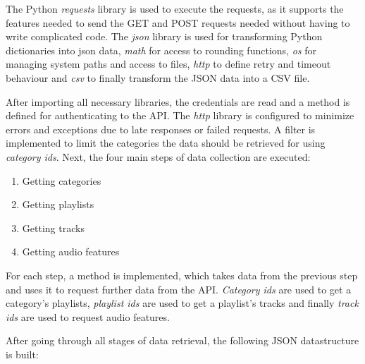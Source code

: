 The Python \emph{requests} library is used to execute the requests, as it supports the features needed to send the GET and POST
requests needed without having to write complicated code.
The \emph{json} library is used for transforming Python dictionaries into json data, \emph{math} for access to rounding functions,
\emph{os} for managing system paths and access to files, \emph{http} to define retry and timeout behaviour and \emph{csv}
to finally transform the JSON data into a CSV file.

After importing all necessary libraries, the credentials are read and a method is defined for authenticating to the API.
The \emph{http} library is configured to minimize errors and exceptions due to late responses or failed requests.
A filter is implemented to limit the categories the data should be retrieved for using \emph{category ids}.
Next, the four main steps of data collection are executed:

\begin{enumerate}
    \item Getting categories
    \item Getting playlists
    \item Getting tracks
    \item Getting audio features
\end{enumerate}

For each step, a method is implemented, which takes data from the previous step and uses it to request further data from the
API. \emph{Category ids} are used to get a category's playlists, \emph{playlist ids} are used to get a playlist's tracks and finally \emph{track ids}
are used to request audio features.

After going through all stages of data retrieval, the following JSON datastructure is built:

